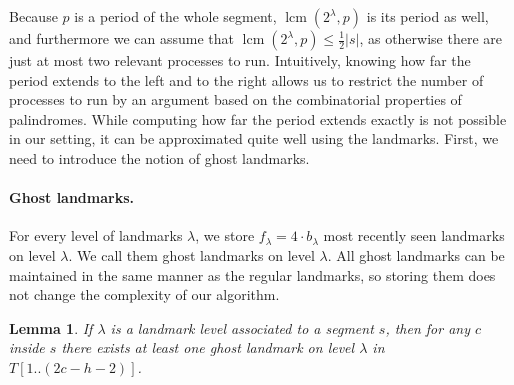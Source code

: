 \documentclass{article}[11pt,letter]
\newtheorem{lemma}[definition]{Lemma}
\newcommand{\head}{h}
\newcommand{\level}{\lambda}
\DeclareMathOperator{\lcm}{lcm}
\newcommand{\kpers}{\ensuremath{p}}
\begin{document}
Because $\kpers$ is a period of the whole segment, $\lcm(2^{\level},\kpers)$ is its period as well, and furthermore we can assume that
$\lcm(2^{\level},\kpers)\leq\frac{1}{2}|s|$, as otherwise there are just at most two relevant processes to run.
Intuitively, knowing how far the period extends to the left and to the right allows us to restrict the number of processes to run
by an argument based on the combinatorial properties of palindromes.
While computing how far the period extends exactly is not possible in our setting, it can be approximated quite well using the landmarks.
First, we need to introduce the notion of ghost landmarks.

\paragraph{Ghost landmarks.} For every level of landmarks $\level$, we store $f_{\level} = 4 \cdot b_{\level}$ most recently seen
landmarks on level $\level$. We call them ghost landmarks on level $\level$. All ghost landmarks can be maintained in the
same manner as the regular landmarks, so storing them does not change the complexity of our algorithm.

\begin{lemma}
\label{lem:using ghosts}
If $\level$ is a landmark level associated to a segment $s$, then for any $c$ inside $s$ there exists at least one ghost landmark on
level $\level$ in $T[1..(2c-\head-2)]$.
\end{lemma}
\end{document}
